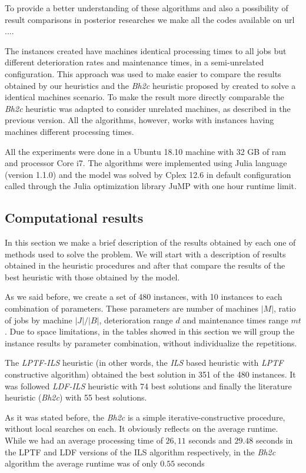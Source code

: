 \documentclass[a4paper,11pt]{article}
\begin{document}
To provide a better understanding of these algorithms and also a possibility of result comparisons in posterior researches we make all the codes available on url ....

The instances created have machines identical processing times to all jobs but different deterioration rates and maintenance times, in a semi-unrelated configuration. This approach was used to make easier to compare the results obtained by our heuristics and the \emph{Bh2c} heuristic proposed by \cite{ruiz2017makespan} created to solve a identical machines scenario. To make the result more directly comparable the \emph{Bh2c} heuristic was adapted to consider unrelated machines, as described in the previous version. All the algorithms, however, works with instances having machines different processing times.  

All the experiments were done in a Ubuntu 18.10 machine with 32 GB of ram and processor Core i7. The algorithms were implemented using Julia language (version 1.1.0) and the model was solved by Cplex 12.6 in default configuration called through the Julia optimization library JuMP with one hour runtime limit. 

\subsection{Computational results} 

In this section we make a brief description of the results obtained by each one of methods used to solve the problem. We will start with a description of results obtained in the heuristic procedures and after that compare the results of the best heuristic with those obtained by the model. 

As we said before, we create a set of 480 instances, with 10 instances to each combination of parameters. These parameters are number of machines $|M|$, ratio of jobs by machine $|J|/|B|$, deterioration range $d$ and maintenance times range $mt$. Due to space limitations, in the tables showed in this section we will group the instance results by parameter combination, without individualize the repetitions. 

The \emph{LPTF-ILS} heuristic (in other words, the \emph{ILS} based heuristic with \emph{LPTF} constructive algorithm) obtained the best solution in 351 of the 480 instances. It was followed \emph{LDF-ILS} heuristic with 74 best solutions and finally the literature heuristic (\emph{Bh2c}) with 55 best solutions. 

As it was stated before, the \emph{Bh2c} is a simple iterative-constructive procedure, without local searches on each. It obviously reflects on the average runtime. While we had an average processing time of $26,11$ seconds and $29.48$ seconds in the LPTF and LDF versions of the ILS algorithm respectively, in the \emph{Bh2c} algorithm the average runtime was of only $0.55$ seconds
\end{document}
